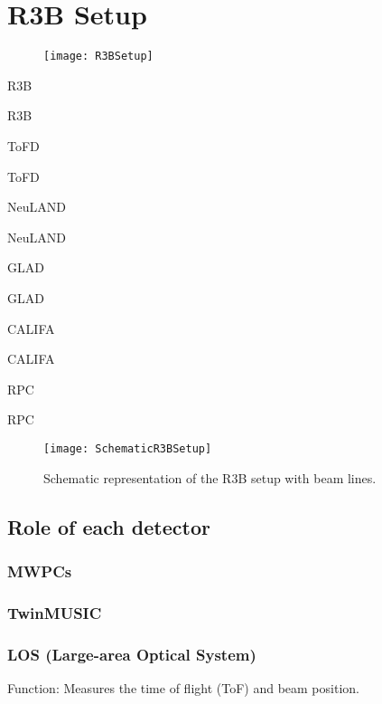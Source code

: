 \section{R3B Setup}

\begin{newpdflayout}{210mm}{297mm}%
	
	\begin{figure}
		\texttt{[image: R3BSetup]}
		\caption{}
		\label{fig:R3B_Setup}
	\end{figure}

\end{newpdflayout}

\gls{R3B}

\gls{R3B}

\gls{ToFD}

\gls{ToFD}

\gls{NeuLAND}

\gls{NeuLAND}

\gls{GLAD}

\gls{GLAD}

\gls{CALIFA}

\gls{CALIFA}

\gls{RPC}

\gls{RPC}
\begin{figure}
	\texttt{[image: SchematicR3BSetup]}
	\caption{Schematic representation of the R3B setup with beam lines.}
	\label{fig:R3BSetup}
\end{figure}



\subsection{Role of each detector}

\subsubsection{MWPCs}

\subsubsection{TwinMUSIC}

\subsubsection{LOS (Large-area Optical System)}

Function: Measures the time of flight (ToF) and beam position.

